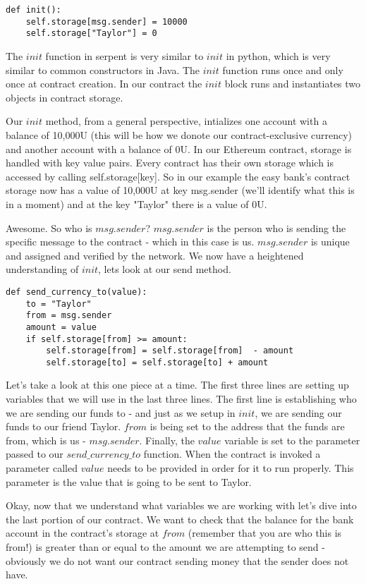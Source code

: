 \documentclass[12pt]{article}
\begin{document}
\begin{lstlisting}
def init():
	self.storage[msg.sender] = 10000
	self.storage["Taylor"] = 0
\end{lstlisting}
	
The $init$ function in serpent is very similar to $init$ in python, which is very similar to common constructors in Java. The $init$ function runs once and only once at contract creation. In our contract the $init$ block runs and instantiates two objects in contract storage.
 
Our $init$ method, from a general perspective, intializes one account with a balance of 10,000U (this will be how we donote our contract-exclusive currency) and another account with a balance of 0U. In our Ethereum contract, storage is handled with key value pairs. Every contract has their own storage which is accessed by calling self.storage[key]. So in our example the easy bank's contract storage now has a value of 10,000U at key msg.sender (we'll identify what this is in a moment) and at the key "Taylor" there is a value of 0U. 

 Awesome. So who is $msg.sender$? $msg.sender$ is the person who is sending the specific message to the contract - which in this case is us. $msg.sender$ is unique and assigned and verified by the network. We now have a heightened understanding of $init$, lets look at our send method.

\begin{lstlisting}[frame=single]
def send_currency_to(value):
	to = "Taylor"
	from = msg.sender
	amount = value
	if self.storage[from] >= amount:
		self.storage[from] = self.storage[from]  - amount
		self.storage[to] = self.storage[to] + amount
\end{lstlisting}

Let's take a look at this one piece at a time. The first three lines are setting up variables that we will use in the last three lines. The first line is establishing who we are sending our funds to - and just as we setup in $init$, we are sending our funds to our friend Taylor. 
$from$ is being set to the address that the funds are from, which is us - $msg.sender$. Finally, the $value$ variable is set to the parameter passed to our $send\_currency\_to$ function. When the contract is invoked a parameter called $value$ needs to be provided in order for it to run properly. This parameter is the value that is going to be sent to Taylor.

Okay, now that we understand what variables we are working with let's dive into the last portion of our contract. We want to check that the balance for the bank account in the contract's storage at $from$ (remember that you are who this is from!) is greater than or equal to the amount we are attempting to send - obviously we do not want our contract sending money that the sender does not have.
\end{document}
